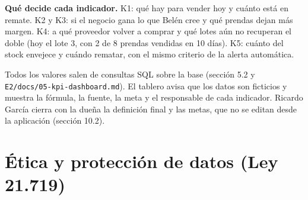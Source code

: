 \documentclass[11pt,letterpaper]{article}
\begin{document}
\textbf{Qué decide cada indicador.} K1: qué hay para vender hoy y cuánto está en remate. K2 y K3: si el negocio gana lo que Belén cree y qué prendas dejan más margen. K4: a qué proveedor volver a comprar y qué lotes aún no recuperan el doble (hoy el lote 3, con 2 de 8 prendas vendidas en 10 días). K5: cuánto del stock envejece y cuándo rematar, con el mismo criterio de la alerta automática.

Todos los valores salen de consultas SQL sobre la base (sección 5.2 y \texttt{E2/\allowbreak{}docs/\allowbreak{}05-kpi-dashboard.md}). El tablero avisa que los datos son ficticios y muestra la fórmula, la fuente, la meta y el responsable de cada indicador. Ricardo García cierra con la dueña la definición final y las metas, que no se editan desde la aplicación (sección 10.2).

\section{Ética y protección de datos (Ley 21.719)}
\end{document}
